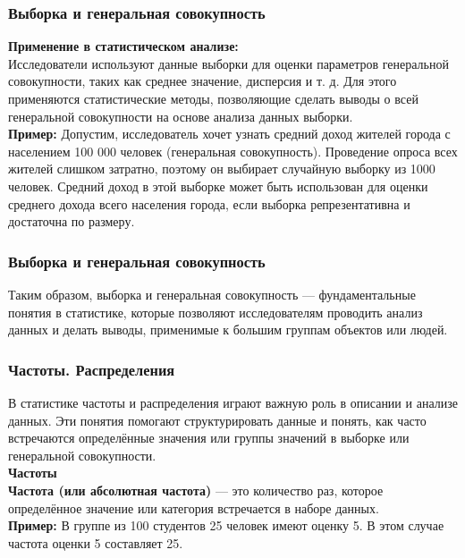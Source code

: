 \documentclass[aspectratio=169]{beamer}
\begin{document}
\begin{frame}
\frametitle{Выборка и генеральная совокупность}
\textbf{Применение в статистическом анализе:}
\newline\\
Исследователи используют данные выборки для оценки параметров генеральной совокупности, таких как среднее значение, дисперсия и т. д. Для этого применяются статистические методы, позволяющие сделать выводы о всей генеральной совокупности на основе анализа данных выборки.
\newline\\
\textbf{Пример:} Допустим, исследователь хочет узнать средний доход жителей города с населением 100 000 человек (генеральная совокупность). Проведение опроса всех жителей слишком затратно, поэтому он выбирает случайную выборку из 1000 человек. Средний доход в этой выборке может быть использован для оценки среднего дохода всего населения города, если выборка репрезентативна и достаточна по размеру.
\end{frame}

\begin{frame}
\frametitle{Выборка и генеральная совокупность}
Таким образом, выборка и генеральная совокупность — фундаментальные понятия в статистике, которые позволяют исследователям проводить анализ данных и делать выводы, применимые к большим группам объектов или людей.
\end{frame}

\begin{frame}
\frametitle{Частоты. Распределения}
В статистике частоты и распределения играют важную роль в описании и анализе данных. Эти понятия помогают структурировать данные и понять, как часто встречаются определённые значения или группы значений в выборке или генеральной совокупности.
\newline\\
\textbf{Частоты}
\newline\\
\textbf{Частота (или абсолютная частота)} — это количество раз, которое определённое значение или категория встречается в наборе данных.
\newline\\
\textbf{Пример:} В группе из 100 студентов 25 человек имеют оценку 5. В этом случае частота оценки 5 составляет 25.
\end{frame}
\end{document}
